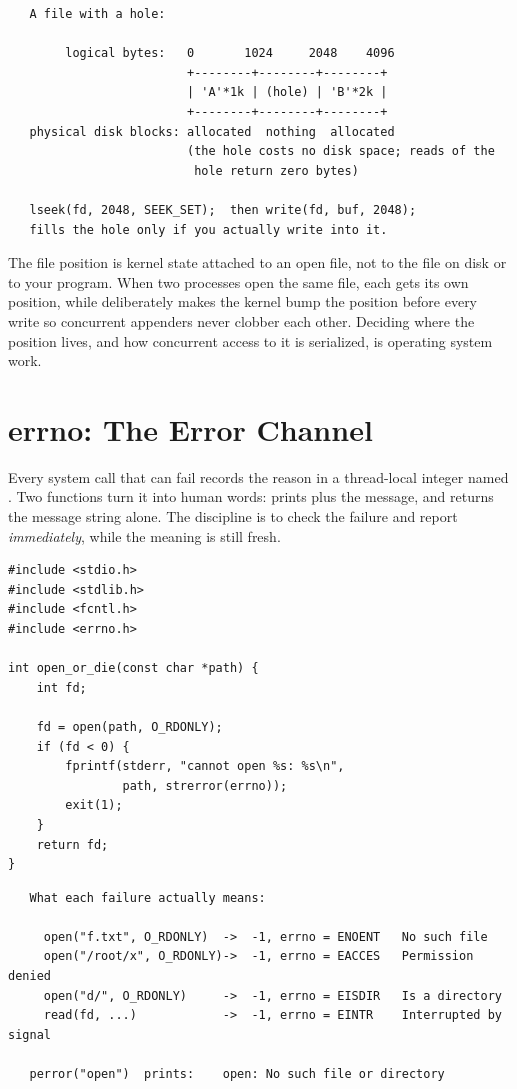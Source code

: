 \begin{verbatim}
   A file with a hole:

        logical bytes:   0       1024     2048    4096
                         +--------+--------+--------+
                         | 'A'*1k | (hole) | 'B'*2k |
                         +--------+--------+--------+
   physical disk blocks: allocated  nothing  allocated
                         (the hole costs no disk space; reads of the
                          hole return zero bytes)

   lseek(fd, 2048, SEEK_SET);  then write(fd, buf, 2048);
   fills the hole only if you actually write into it.
\end{verbatim}

\begin{osconcept}
The file position is kernel state attached to an open file, not to the
file on disk or to your program. When two processes open the same file,
each gets its own position, while  deliberately makes
the kernel bump the position before every write so concurrent appenders
never clobber each other. Deciding where the position lives, and how
concurrent access to it is serialized, is operating system work.
\end{osconcept}

\section{errno: The Error Channel}

Every system call that can fail records the reason in a thread-local
integer named . Two functions turn it into human words:
 prints  plus the message, and
 returns the message string alone. The discipline
is to check the failure and report \emph{immediately}, while the
meaning is still fresh.

\begin{lstlisting}[caption={The error-handling pattern used everywhere in this book.}]
#include <stdio.h>
#include <stdlib.h>
#include <fcntl.h>
#include <errno.h>

int open_or_die(const char *path) {
    int fd;

    fd = open(path, O_RDONLY);
    if (fd < 0) {
        fprintf(stderr, "cannot open %s: %s\n",
                path, strerror(errno));
        exit(1);
    }
    return fd;
}
\end{lstlisting}

\begin{verbatim}
   What each failure actually means:

     open("f.txt", O_RDONLY)  ->  -1, errno = ENOENT   No such file
     open("/root/x", O_RDONLY)->  -1, errno = EACCES   Permission denied
     open("d/", O_RDONLY)     ->  -1, errno = EISDIR   Is a directory
     read(fd, ...)            ->  -1, errno = EINTR    Interrupted by signal

   perror("open")  prints:    open: No such file or directory
\end{verbatim}

